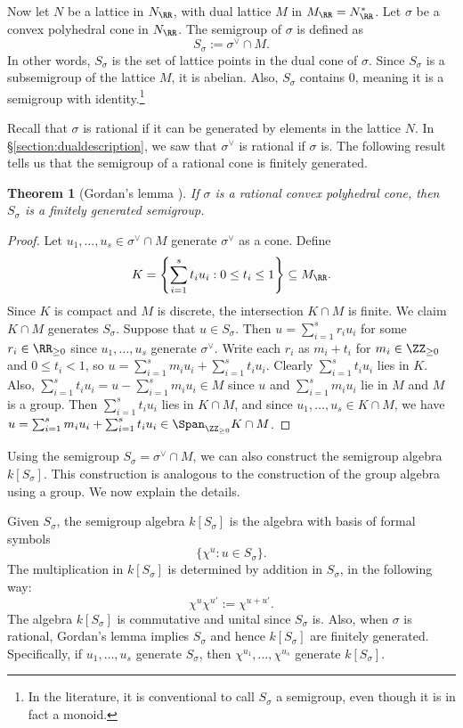 \documentclass[12pt]{amsart}
\theoremstyle{plain}
\newtheorem{theorem}{Theorem}[subsection]
\begin{document}
Now let $N$ be a lattice in $N_\RR$, with dual lattice $M$ in $M_\RR = N_\RR^*$.
Let $\sigma$ be a convex polyhedral cone in $N_\RR$.
The semigroup of $\sigma$ is defined as
$$S_\sigma := \sigma^\vee \cap M.$$
In other words, $S_\sigma$ is the set of lattice points in the dual cone of $\sigma$.
Since $S_\sigma$ is a subsemigroup of the lattice $M$, it is abelian.
Also, $S_\sigma$ contains $0$, meaning it is a semigroup with identity.\footnote{In the literature, it is conventional to call $S_\sigma$ a semigroup, even though it is in fact a monoid.}

Recall that $\sigma$ is rational if it can be generated by elements in the lattice $N$.
In \S \ref{section:dualdescription}, we saw that $\sigma^\vee$ is rational if $\sigma$ is.
The following result tells us that the semigroup of a rational cone is finitely generated.

\begin{theorem}[Gordan's lemma {\cite[\S 1.2]{Fulton93}}]\label{gordanslemma}
If $\sigma$ is a rational convex polyhedral cone, then $S_\sigma$ is a finitely generated semigroup.
\end{theorem}
\begin{proof}
Let $u_1, \ldots, u_s \in \sigma^\vee \cap M$ generate $\sigma^\vee$ as a cone.
Define
$$K = \left\{\sum_{i=1}^s t_i u_i : 0 \le t_i \le 1\right\} \subseteq M_\RR.$$
Since $K$ is compact and $M$ is discrete, the intersection $K \cap M$ is finite.
We claim $K \cap M$ generates $S_\sigma$.
Suppose that $u \in S_\sigma$.
Then $u =\sum_{i=1}^s r_i u_i$ for some $r_i \in \RR_{\ge 0}$ since $u_1, \ldots, u_s$ generate $\sigma^\vee$.
Write each $r_i$ as $m_i + t_i$ for $m_i \in \ZZ_{\ge 0}$ and $0 \le t_i < 1$, so $u = \sum_{i=1}^s m_i u_i + \sum_{i=1}^s t_i u_i$.
Clearly $\sum_{i=1}^s t_i u_i$ lies in $K$.
Also, $\sum_{i=1}^s t_i u_i = u - \sum_{i=1}^s m_i u_i \in M$ since $u$ and $\sum_{i=1}^s m_i u_i$ lie in $M$ and $M$ is a group.
Then $\sum_{i=1}^s t_i u_i$ lies in $K \cap M$, and since $u_1, \ldots, u_s \in K \cap M$, we have $u = \sum_{i=1}^s m_i u_i + \sum_{i=1}^s t_i u_i \in \Span_{\ZZ_{\ge 0}} K \cap M$.
\end{proof}

Using the semigroup $S_\sigma = \sigma^\vee \cap M$, we can also construct the semigroup algebra $k[S_\sigma]$.
This construction is analogous to the construction of the group algebra using a group.
We now explain the details.

Given $S_\sigma$, the semigroup algebra $k[S_\sigma]$ is the algebra with basis of formal symbols
$$\{\chi^u : u \in S_\sigma\}.$$
The multiplication in $k[S_\sigma]$ is determined by addition in $S_\sigma$, in the following way:
$$\chi^u \chi^{u'} := \chi^{u + u'}.$$
The algebra $k[S_\sigma]$ is commutative and unital since $S_\sigma$ is.
Also, when $\sigma$ is rational, Gordan's lemma implies $S_\sigma$ and hence $k[S_\sigma]$ are finitely generated.
Specifically, if $u_1, \ldots, u_s$ generate $S_\sigma$, then $\chi^{u_1}, \ldots, \chi^{u_s}$ generate $k[S_\sigma]$.
\end{document}
